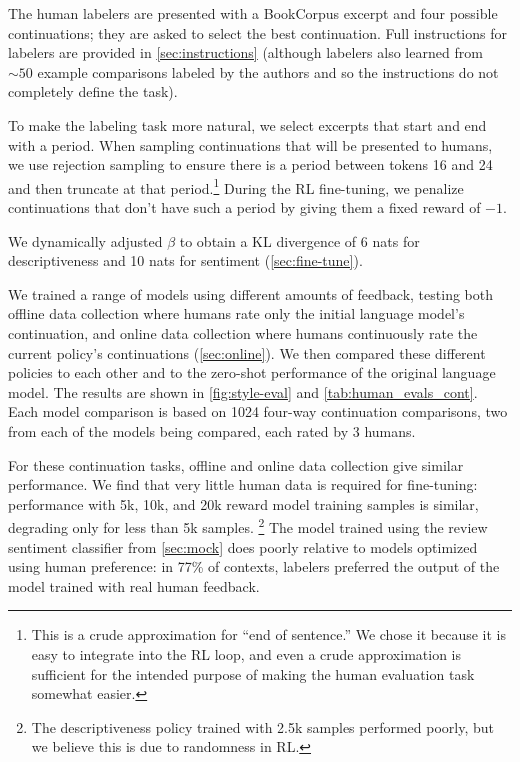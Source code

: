 \documentclass{article}
\begin{document}
The human labelers are presented with a BookCorpus excerpt and four possible continuations; they are asked to select the best continuation.  Full instructions for labelers are provided in \cref{sec:instructions}
(although labelers also learned from $\sim 50$ example comparisons labeled by the authors
and so the instructions do not completely define the task).

To make the labeling task more natural, we select excerpts that start and end with a period.
When sampling continuations that will be presented to humans,
we use rejection sampling to ensure there is a period between tokens 16 and 24
and then truncate at that period.\footnote{This is a crude approximation
for ``end of sentence.''
We chose it because it is easy to integrate into the RL loop,
and even a crude approximation is sufficient for the intended purpose
of making the human evaluation task somewhat easier.}
During the RL fine-tuning, we penalize continuations that don't have such a period
by giving them a fixed reward of $-1$.

We dynamically adjusted $\beta$ to obtain a KL divergence of 6 nats for descriptiveness
and 10 nats for sentiment (\cref{sec:fine-tune}).


We trained a range of models using different amounts of feedback,
testing both offline data collection where humans
rate only the initial language model's continuation,
and online data collection where humans continuously rate
the current policy's continuations (\cref{sec:online}).
We then compared these different policies to each other
and to the zero-shot performance of the original language model.
The results are shown in \cref{fig:style-eval} and \cref{tab:human_evals_cont}.
Each model comparison is based on 1024 four-way continuation comparisons,
two from each of the models being compared,
each rated by 3 humans.

For these continuation tasks, offline and online data collection give similar performance.
We find that very little human data is required for fine-tuning: performance with 5k, 10k, and 20k reward model training samples is similar, degrading only for less than 5k samples.%
\footnote{The descriptiveness policy trained with 2.5k samples performed poorly, but we believe this is due to randomness in RL.}
The model trained using the review sentiment classifier from \cref{sec:mock} does poorly relative to models optimized using human preference:
in 77\% of contexts, labelers preferred the output of the model trained with real human feedback.
\end{document}
